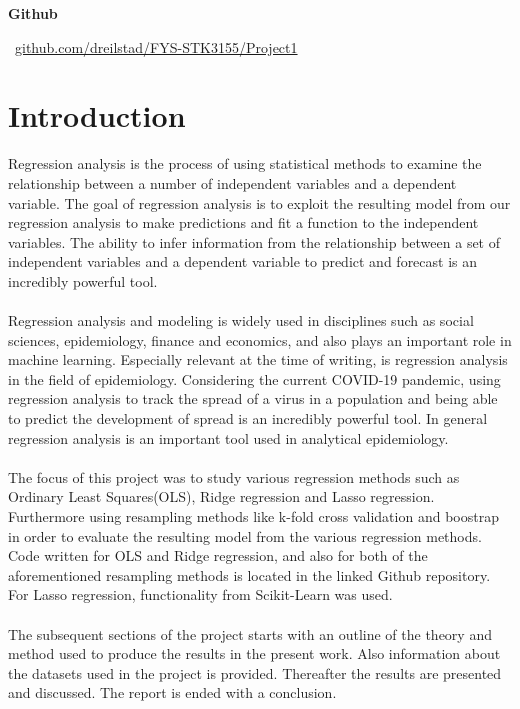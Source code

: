 \documentclass[a4paper,twocolumn]{article}
\begin{document}
\raggedbottom
\begin{center}
    \small \textbf{Github}
    
    \vspace{0.2cm}
    
    \faGithub \ \small \href{https://github.com/dreilstad/FYS-STK3155/tree/master/Project1}{github.com/dreilstad/FYS-STK3155/Project1}
\end{center}
\vspace{0.5cm}
\section{Introduction}
Regression analysis is the process of using statistical methods to examine the relationship between a number of independent variables and a dependent variable. The goal of regression analysis is to exploit the resulting model from our regression analysis to make predictions and fit a function to the independent variables. The ability to infer information from the relationship between a set of independent variables and a dependent variable to predict and forecast is an incredibly powerful tool.\\
\\
Regression analysis and modeling is widely used in disciplines such as social sciences, epidemiology, finance and economics, and also plays an important role in machine learning. Especially relevant at the time of writing, is regression analysis in the field of epidemiology. Considering the current COVID-19 pandemic, using regression analysis to track the spread of a virus in a population and being able to predict the development of spread is an incredibly powerful tool. In general regression analysis is an important tool used in analytical epidemiology.\cite{epidemiology}\\
\\
The focus of this project was to study various regression methods such as Ordinary Least Squares(OLS), Ridge regression and Lasso regression. Furthermore using resampling methods like k-fold cross validation and boostrap in order to evaluate the resulting model from the various regression methods. Code written for OLS and Ridge regression, and also for both of the aforementioned resampling methods is located in the linked Github repository. For Lasso regression, functionality from Scikit-Learn was used. \\
\\
The subsequent sections of the project starts with an outline of the theory and method used to produce the results in the present work. Also information about the datasets used in the project is provided. Thereafter the results are presented and discussed. The report is ended with a conclusion.
\end{document}
